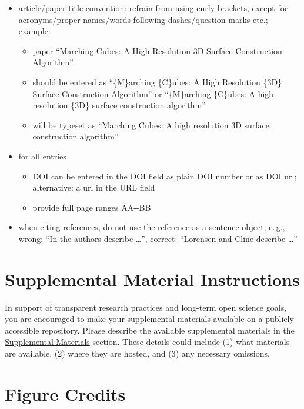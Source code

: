 \documentclass[review]{vgtc}                 %
\begin{document}
\begin{itemize}
\begin{itemize}
  \end{itemize}
\item article/paper title convention: refrain from using curly brackets, except for acronyms/proper names/words following dashes/question marks etc.; example:
\begin{itemize}
	\item paper ``Marching Cubes: A High Resolution 3D Surface Construction Algorithm''
	\item should be entered as ``\{M\}arching \{C\}ubes: A High Resolution \{3D\} Surface Construction Algorithm'' or  ``\{M\}arching \{C\}ubes: A high resolution \{3D\} surface construction algorithm''
	\item will be typeset as ``Marching Cubes: A high resolution 3D surface construction algorithm''
\end{itemize}
\item for all entries
\begin{itemize}
	\item DOI can be entered in the DOI field as plain DOI number or as DOI url; alternative: a url in the URL field
	\item provide full page ranges AA-{}-BB
\end{itemize}
\item when citing references, do not use the reference as a sentence object; e.\,g., wrong: ``In \cite{Lorensen:1987:MCA} the authors describe \dots'', correct: ``Lorensen and Cline \cite{Lorensen:1987:MCA} describe \dots''
\end{itemize}

\section{Supplemental Material Instructions}
\label{sec:supplement_inst}

In support of transparent research practices and long-term open science goals, you are encouraged to make your supplemental materials available on a publicly-accessible repository.
Please describe the available supplemental materials in the \hyperref[sec:supplemental_materials]{Supplemental Materials} section.
These details could include (1) what materials are available, (2) where they are hosted, and (3) any necessary omissions.

\section{Figure Credits}
\label{sec:figure_credits_inst}
\end{document}
